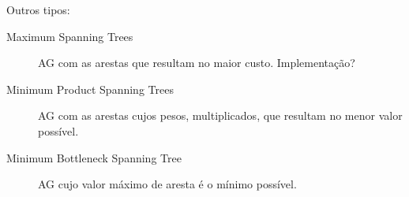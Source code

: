 \begin{frame}
	Outros tipos:
	\begin{description}
		\item[Maximum Spanning Trees] AG com as arestas que resultam no maior
		custo. Implementação?%
		\item[Minimum Product Spanning Trees] AG com as arestas cujos pesos,
		multiplicados, que resultam no menor valor possível.%
		\item[Minimum Bottleneck Spanning Tree] AG cujo valor máximo de aresta
		é o mínimo possível. %
	\end{description}
\end{frame}


